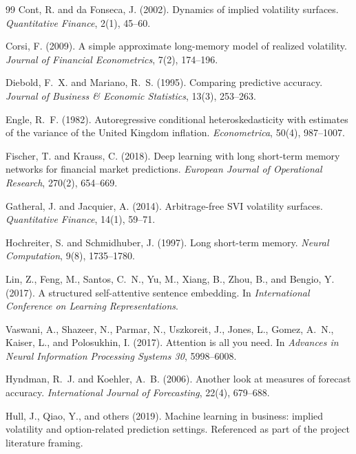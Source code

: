\documentclass[12pt]{report}
\begin{document}
\begin{thebibliography}{99}
Cont, R. and da Fonseca, J. (2002).
\newblock Dynamics of implied volatility surfaces.
\newblock \emph{Quantitative Finance}, 2(1), 45--60.

Corsi, F. (2009).
\newblock A simple approximate long-memory model of realized volatility.
\newblock \emph{Journal of Financial Econometrics}, 7(2), 174--196.

Diebold, F.~X. and Mariano, R.~S. (1995).
\newblock Comparing predictive accuracy.
\newblock \emph{Journal of Business \& Economic Statistics}, 13(3), 253--263.

Engle, R.~F. (1982).
\newblock Autoregressive conditional heteroskedasticity with estimates of the variance of the United Kingdom inflation.
\newblock \emph{Econometrica}, 50(4), 987--1007.

Fischer, T. and Krauss, C. (2018).
\newblock Deep learning with long short-term memory networks for financial market predictions.
\newblock \emph{European Journal of Operational Research}, 270(2), 654--669.

Gatheral, J. and Jacquier, A. (2014).
\newblock Arbitrage-free SVI volatility surfaces.
\newblock \emph{Quantitative Finance}, 14(1), 59--71.

Hochreiter, S. and Schmidhuber, J. (1997).
\newblock Long short-term memory.
\newblock \emph{Neural Computation}, 9(8), 1735--1780.

Lin, Z., Feng, M., Santos, C.~N., Yu, M., Xiang, B., Zhou, B., and Bengio, Y. (2017).
\newblock A structured self-attentive sentence embedding.
\newblock In \emph{International Conference on Learning Representations}.

Vaswani, A., Shazeer, N., Parmar, N., Uszkoreit, J., Jones, L., Gomez, A.~N., Kaiser, L., and Polosukhin, I. (2017).
\newblock Attention is all you need.
\newblock In \emph{Advances in Neural Information Processing Systems 30}, 5998--6008.

Hyndman, R.~J. and Koehler, A.~B. (2006).
\newblock Another look at measures of forecast accuracy.
\newblock \emph{International Journal of Forecasting}, 22(4), 679--688.

Hull, J., Qiao, Y., and others (2019).
\newblock Machine learning in business: implied volatility and option-related prediction settings.
\newblock Referenced as part of the project literature framing.


\end{thebibliography}
\end{document}
